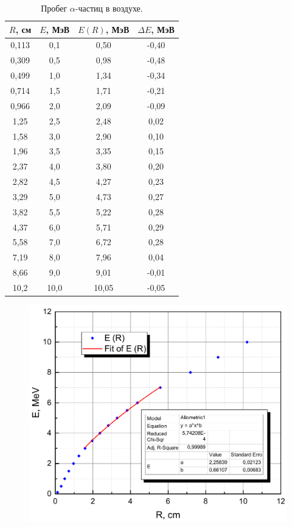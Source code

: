 \documentclass[a4paper,12pt]{article} %
\begin{document}
	\begin{table}[H]
		\caption{Пробег $\alpha$-частиц в воздухе.}
		\label{table:conclusion}
		\begin{tabular}{|c|c|c|c|}
			\hline
			$R$, см & $E$, МэВ & $E(R)$, МэВ & $\Delta E$, МэВ \\ \hline
			0,113   & 0,1      & 0,50        & -0,40           \\ \hline
			0,309   & 0,5      & 0,98        & -0,48           \\ \hline
			0,499   & 1,0      & 1,34        & -0,34           \\ \hline
			0,714   & 1,5      & 1,71        & -0,21           \\ \hline
			0,966   & 2,0      & 2,09        & -0,09           \\ \hline
			1,25    & 2,5      & 2,48        & 0,02            \\ \hline
			1,58    & 3,0      & 2,90        & 0,10            \\ \hline
			1,96    & 3,5      & 3,35        & 0,15            \\ \hline
			2,37    & 4,0      & 3,80        & 0,20            \\ \hline
			2,82    & 4,5      & 4,27        & 0,23            \\ \hline
			3,29    & 5,0      & 4,73        & 0,27            \\ \hline
			3,82    & 5,5      & 5,22        & 0,28            \\ \hline
			4,37    & 6,0      & 5,71        & 0,29            \\ \hline
			5,58    & 7,0      & 6,72        & 0,28            \\ \hline
			7,19    & 8,0      & 7,96        & 0,04            \\ \hline
			8,66    & 9,0      & 9,01        & -0,01           \\ \hline
			10,2    & 10,0     & 10,05       & -0,05           \\ \hline
		\end{tabular}
	\end{table}


	\begin{figure}[h!]
		\begin{floatrow}
			{\includegraphics[scale=0.5]{graph4.pdf}}    
		\end{floatrow}
	\end{figure}
\end{document}
